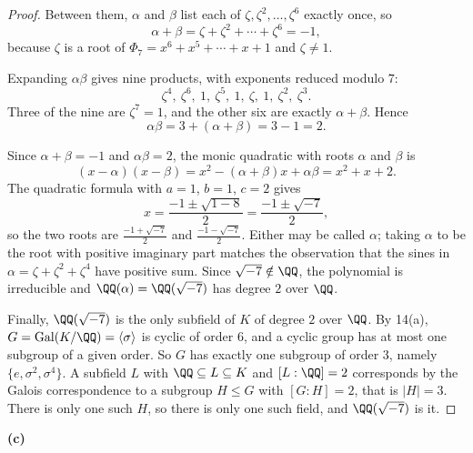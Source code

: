 \documentclass[11pt]{article}
\begin{document}
\begin{proof}
Between them, $\alpha$ and $\beta$ list each of $\zeta,\zeta^{2},\dots,\zeta^{6}$ exactly once, so
\[
\alpha+\beta=\zeta+\zeta^{2}+\cdots+\zeta^{6}=-1,
\]
because $\zeta$ is a root of $\Phi_7=x^{6}+x^{5}+\cdots+x+1$ and $\zeta\neq1$.

Expanding $\alpha\beta$ gives nine products, with exponents reduced modulo $7$:
\[
\zeta^{4},\ \zeta^{6},\ 1,\ \zeta^{5},\ 1,\ \zeta,\ 1,\ \zeta^{2},\ \zeta^{3}.
\]
Three of the nine are $\zeta^{7}=1$, and the other six are exactly $\alpha+\beta$. Hence
\[
\alpha\beta=3+(\alpha+\beta)=3-1=2.
\]

Since $\alpha+\beta=-1$ and $\alpha\beta=2$, the monic quadratic with roots $\alpha$ and $\beta$ is
\[
(x-\alpha)(x-\beta)=x^{2}-(\alpha+\beta)x+\alpha\beta=x^{2}+x+2.
\]
The quadratic formula with $a=1$, $b=1$, $c=2$ gives
\[
x=\frac{-1\pm\sqrt{1-8}}{2}=\frac{-1\pm\sqrt{-7}}{2},
\]
so the two roots are $\frac{-1+\sqrt{-7}}{2}$ and $\frac{-1-\sqrt{-7}}{2}$. Either may be called $\alpha$; taking $\alpha$ to be the root with positive imaginary part matches the observation that the sines in $\alpha=\zeta+\zeta^{2}+\zeta^{4}$ have positive sum. Since $\sqrt{-7}\notin\QQ$, the polynomial is irreducible and $\QQ(\alpha)=\QQ(\sqrt{-7})$ has degree $2$ over $\QQ$.

Finally, $\QQ(\sqrt{-7})$ is the only subfield of $K$ of degree $2$ over $\QQ$. By 14(a), $G=\operatorname{Gal}(K/\QQ)=\langle\sigma\rangle$ is cyclic of order $6$, and a cyclic group has at most one subgroup of a given order. So $G$ has exactly one subgroup of order $3$, namely $\{e,\sigma^{2},\sigma^{4}\}$. A subfield $L$ with $\QQ\subseteq L\subseteq K$ and $[L:\QQ]=2$ corresponds by the Galois correspondence to a subgroup $H\le G$ with $[G:H]=2$, that is $|H|=3$. There is only one such $H$, so there is only one such field, and $\QQ(\sqrt{-7})$ is it.
\end{proof}
\noindent\textbf{(c)}
\end{document}
